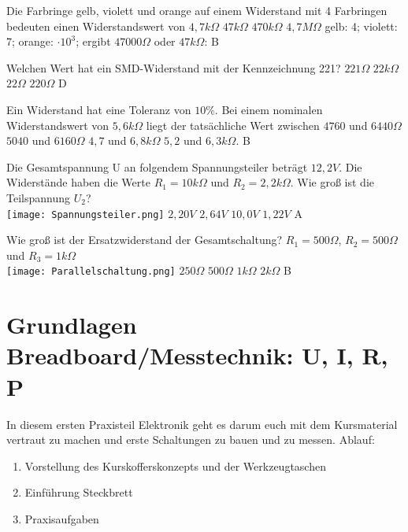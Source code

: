 {Die Farbringe gelb, violett und orange auf einem Widerstand mit 4 Farbringen bedeuten einen Widerstandswert von}%
{$4,7k\Omega$}%
{$47k\Omega$}%
{$470k\Omega$}%
{$4,7M\Omega$}%
{gelb: 4; violett: 7; orange: $\cdot 10^3$; ergibt $47000\Omega$ oder $47k\Omega$: B}%

{Welchen Wert hat ein SMD-Widerstand mit der Kennzeichnung 221?}%
{$221\Omega$}%
{$22k\Omega$}%
{$22\Omega$}%
{$220\Omega$}%
{D}%

{Ein Widerstand hat eine Toleranz von $10 \%$. Bei einem nominalen Widerstandswert von $5,6 k\Omega$ liegt der tatsächliche Wert zwischen}%
{$4760$ und $6440 \Omega$}%
{$5040$ und $6160 \Omega$}%
{$4,7$ und $6,8 k\Omega$}%
{$5,2$ und $6,3 k\Omega.$}%
{B}%

{Die Gesamtspannung U an folgendem Spannungsteiler beträgt $12,2V$. Die
Widerstände haben die Werte $R_1 = 10k\Omega$ und $R_2 = 2,2k\Omega$. Wie groß
ist die Teilspannung $U_2$?\\ \texttt{[image: Spannungsteiler.png]}}%
{$2,20V$}%
{$2,64V$}%
{$10,0V$}%
{$1,22V$}%
{A}%

{Wie groß ist der Ersatzwiderstand der Gesamtschaltung? 
$R_1 = 500\Omega$, $R_2 = 500\Omega$ und $R_3 = 1k\Omega$\\ \texttt{[image: Parallelschaltung.png]}}%
{$250\Omega$}%
{$500\Omega$}%
{$1k\Omega$}%
{$2k\Omega$}%
{B}%


\clearpage

\section{Grundlagen Breadboard/Messtechnik: U, I, R, P}

In diesem ersten Praxisteil Elektronik geht es darum euch mit dem Kursmaterial
vertraut zu machen und erste Schaltungen zu bauen und zu messen. Ablauf:

\begin{enumerate}
  \item Vorstellung des Kurskofferskonzepts und der Werkzeugtaschen
  \item Einführung Steckbrett
  \item Praxisaufgaben
\end{enumerate}

